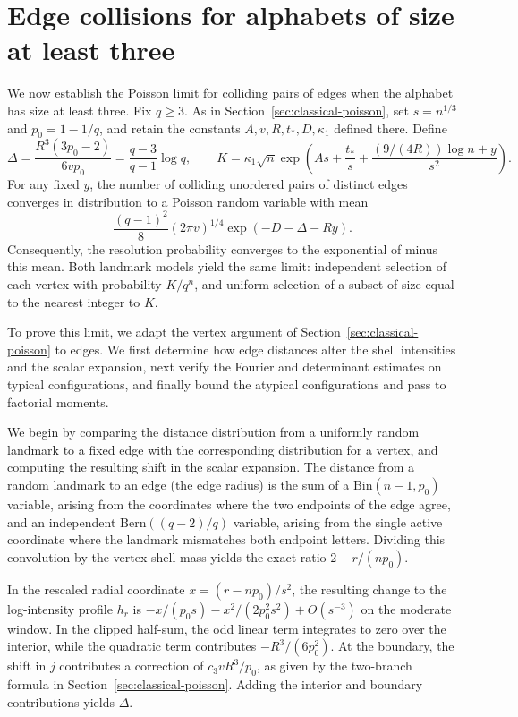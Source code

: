 \section{Edge collisions for alphabets of size at least three}
\label{sec:qary-edge-poisson}

We now establish the Poisson limit for colliding pairs of edges when the alphabet has size at least three. Fix \(q\ge3\). As in Section~\ref{sec:classical-poisson}, set \(s=n^{1/3}\) and \(p_0=1-1/q\), and retain the constants \(A,v,R,t_*,D,\kappa_1\) defined there. Define
\[
 \Delta=\frac{R^3(3p_0-2)}{6vp_0}=\frac{q-3}{q-1}\log q,\qquad
 K=\kappa_1\sqrt n\exp\left(As+\frac{t_*}{s}
              +\frac{(9/(4R))\log n+y}{s^2}\right).
\]
For any fixed \(y\), the number of colliding unordered pairs of distinct edges converges in distribution to a Poisson random variable with mean
\[
 \frac{(q-1)^2}{8}(2\pi v)^{1/4}\exp(-D-\Delta-Ry).
\]
Consequently, the resolution probability converges to the exponential of minus this mean. Both landmark models yield the same limit: independent selection of each vertex with probability \(K/q^n\), and uniform selection of a subset of size equal to the nearest integer to \(K\).

To prove this limit, we adapt the vertex argument of Section~\ref{sec:classical-poisson} to edges. We first determine how edge distances alter the shell intensities and the scalar expansion, next verify the Fourier and determinant estimates on typical configurations, and finally bound the atypical configurations and pass to factorial moments.

We begin by comparing the distance distribution from a uniformly random landmark to a fixed edge with the corresponding distribution for a vertex, and computing the resulting shift in the scalar expansion. The distance from a random landmark to an edge (the edge radius) is the sum of a \(\mathrm{Bin}(n-1,p_0)\) variable, arising from the coordinates where the two endpoints of the edge agree, and an independent \(\mathrm{Bern}((q-2)/q)\) variable, arising from the single active coordinate where the landmark mismatches both endpoint letters. Dividing this convolution by the vertex shell mass yields the exact ratio \(2-r/(np_0)\).

In the rescaled radial coordinate \(x=(r-np_0)/s^2\), the resulting change to the log-intensity profile \(h_r\) is \(-x/(p_0s)-x^2/(2p_0^2s^2)+O(s^{-3})\) on the moderate window. In the clipped half-sum, the odd linear term integrates to zero over the interior, while the quadratic term contributes \(-R^3/(6p_0^2)\). At the boundary, the shift in \(j\) contributes a correction of \(c_3vR^3/p_0\), as given by the two-branch formula in Section~\ref{sec:classical-poisson}. Adding the interior and boundary contributions yields \(\Delta\).

